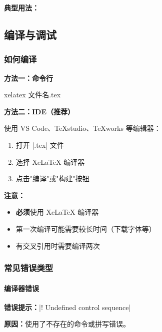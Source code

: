 \textbf{典型用法：}
\begin{latexcode}

\end{latexcode}


\subsection{编译与调试}

\subsubsection{如何编译}

\textbf{方法一：命令行}
\begin{shellcode}[morekeywords={xelatex}]
  xelatex 文件名.tex
\end{shellcode}

\textbf{方法二：IDE（推荐）}

使用 VS Code、TeXstudio、TeXworks 等编辑器：
\begin{enumerate}
  \item 打开 |.tex| 文件
  \item 选择 XeLaTeX 编译器
  \item 点击"编译"或"构建"按钮
\end{enumerate}

\textbf{注意：}
\begin{itemize}
  \item \textbf{必须}使用 XeLaTeX 编译器
  \item 第一次编译可能需要较长时间（下载字体等）
  \item 有交叉引用时需要编译两次
\end{itemize}

\subsubsection{常见错误类型}

\paragraph{编译器错误}

\textbf{错误提示：}|! Undefined control sequence|

\textbf{原因：}使用了不存在的命令或拼写错误。

